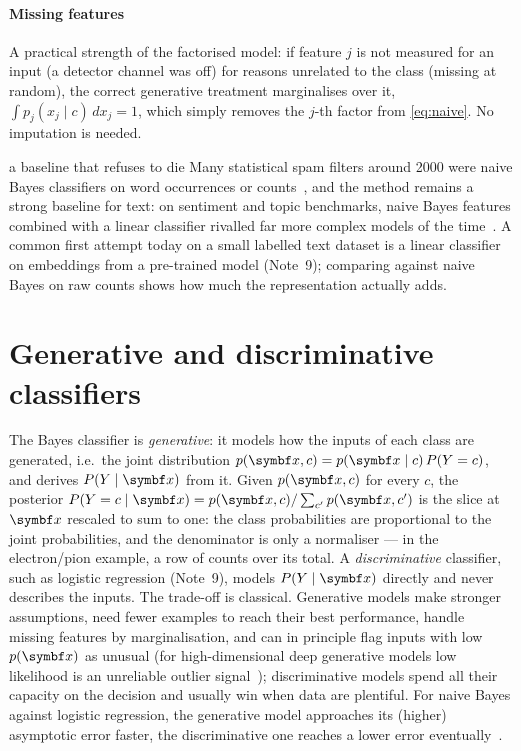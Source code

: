 \documentclass[11pt]{article}
\begin{document}
\paragraph{Missing features} A practical strength of the factorised model: if feature $j$ is not measured for an input
(a detector channel was off) for reasons unrelated to the class (missing at random), the correct generative treatment
marginalises over it,
$\int p_j(x_j \mid c)\, dx_j = 1$, which simply removes the $j$-th factor from \eqref{eq:naive}. No imputation is
needed.

\begin{modern}{a baseline that refuses to die}
Many statistical spam filters around 2000 were naive Bayes classifiers on word occurrences or
counts~\cite{sahami1998}, and the method remains a strong baseline for text: on sentiment and topic benchmarks, naive Bayes features combined with a linear classifier rivalled far more
complex models of the time~\cite{wang2012}. A common first attempt today on a small labelled text dataset is a linear
classifier on embeddings from a pre-trained model (Note~9); comparing against naive Bayes on raw counts shows how much
the representation actually adds.
\end{modern}

\section{Generative and discriminative classifiers}\label{sec:gendisc}

The Bayes classifier is \emph{generative}: it models how the inputs of each class are generated, i.e.\ the joint
distribution $p(\x, c) = p(\x \mid c)\,P(Y = c)$, and derives $P(Y \mid \x)$ from it. Given $p(\x, c)$ for every $c$, the
posterior $P(Y = c \mid \x) = p(\x, c) / \sum_{c'} p(\x, c')$ is the slice at $\x$ rescaled to sum to one: the class
probabilities are proportional to the joint probabilities, and the denominator is only a normaliser --- in the electron/pion example, a row of counts over its total. A
\emph{discriminative} classifier, such as logistic regression (Note~9), models $P(Y \mid \x)$ directly and never
describes the inputs. The trade-off is classical. Generative models make stronger assumptions, need fewer examples
to reach their best performance, handle missing features by marginalisation, and can in principle flag inputs with
low $p(\x)$ as unusual (for high-dimensional deep generative models low likelihood is an unreliable outlier
signal~\cite{nalisnick2019}); discriminative models spend all their capacity on the decision and usually win when data are
plentiful. For naive Bayes against logistic regression, the generative model approaches its (higher) asymptotic error
faster, the discriminative one reaches a lower error eventually~\cite{ng2002}.
\end{document}
